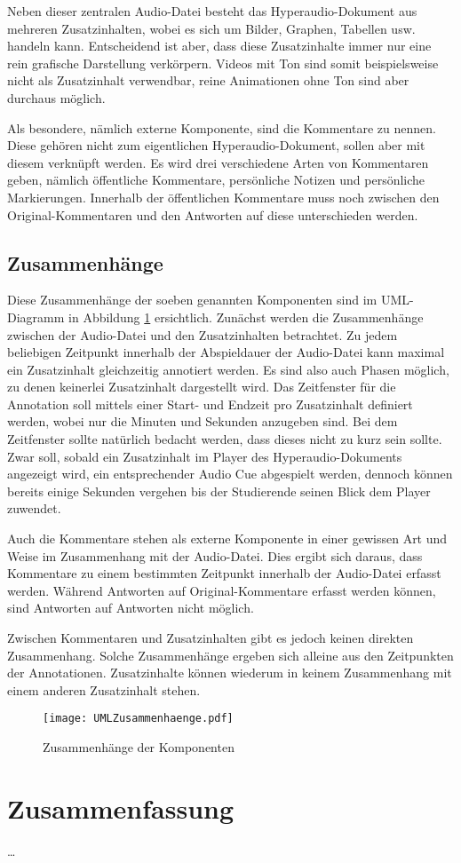 Neben dieser zentralen Audio-Datei besteht das Hyperaudio-Dokument aus mehreren Zusatzinhalten, wobei es sich um Bilder, Graphen, Tabellen usw. handeln kann. Entscheidend ist aber, dass diese Zusatzinhalte immer nur eine rein grafische Darstellung verkörpern. Videos mit Ton sind somit beispielsweise nicht als Zusatzinhalt verwendbar, reine Animationen ohne Ton sind aber durchaus möglich.

Als besondere, nämlich externe Komponente, sind die Kommentare zu nennen. Diese gehören nicht zum eigentlichen Hyperaudio-Dokument, sollen aber mit diesem verknüpft werden. Es wird drei verschiedene Arten von Kommentaren geben, nämlich  öffentliche Kommentare, persönliche Notizen und persönliche Markierungen. Innerhalb der öffentlichen Kommentare muss noch zwischen den Original-Kommentaren und den Antworten auf diese unterschieden werden. 


\subsection{Zusammenhänge}
Diese Zusammenhänge der soeben genannten Komponenten sind im UML-Diagramm in Abbildung \ref{fig:UMLAufbau} ersichtlich. Zunächst werden die Zusammenhänge zwischen der Audio-Datei und den Zusatzinhalten betrachtet. Zu jedem beliebigen Zeitpunkt innerhalb der Abspieldauer der Audio-Datei kann maximal ein Zusatzinhalt gleichzeitig annotiert werden. Es sind also auch Phasen möglich, zu denen keinerlei Zusatzinhalt dargestellt wird. Das Zeitfenster für die Annotation soll mittels einer Start- und Endzeit pro Zusatzinhalt definiert werden, wobei nur die Minuten und Sekunden anzugeben sind. Bei dem Zeitfenster sollte natürlich bedacht werden, dass dieses nicht zu kurz sein sollte. Zwar soll, sobald ein Zusatzinhalt im Player des Hyperaudio-Dokuments angezeigt wird, ein entsprechender Audio Cue abgespielt werden, dennoch können bereits einige Sekunden vergehen bis der Studierende seinen Blick dem Player zuwendet.

Auch die Kommentare stehen als externe Komponente in einer gewissen Art und Weise im Zusammenhang mit der Audio-Datei. Dies ergibt sich daraus, dass Kommentare zu einem bestimmten Zeitpunkt innerhalb der Audio-Datei erfasst werden. Während Antworten auf Original-Kommentare erfasst werden können, sind Antworten auf Antworten nicht möglich.


Zwischen Kommentaren und Zusatzinhalten gibt es jedoch keinen direkten Zusammenhang. Solche Zusammenhänge ergeben sich alleine aus den Zeitpunkten der Annotationen. Zusatzinhalte können wiederum in keinem Zusammenhang mit einem anderen Zusatzinhalt stehen.


\begin{figure}[h!]
\texttt{[image: UMLZusammenhaenge.pdf]}
\caption{\label{fig:UMLAufbau}Zusammenhänge der Komponenten}
\end{figure}

\section{Zusammenfassung}
\dots
